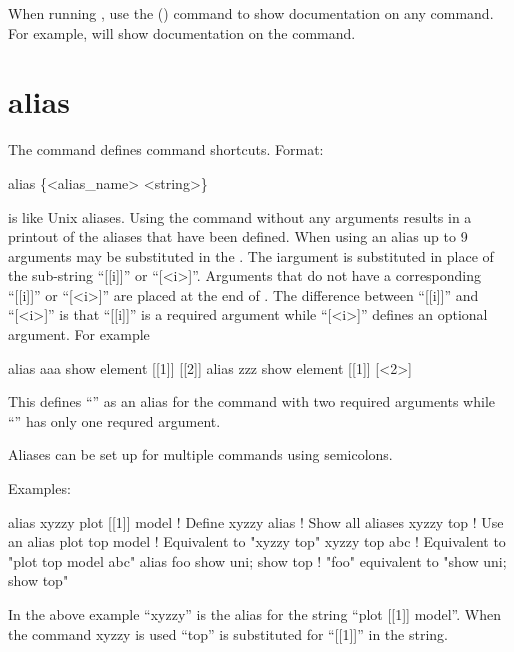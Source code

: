 When running \tao, use the  () command to show documentation on any command.
For example,  will show documentation on the  command.


\vfil
\break

\section{alias}
\label{s:alias}

The  command defines command shortcuts. Format:
\begin{example}
  alias \{<alias_name> <string>\}
\end{example}

\vskip 7pt 

 is like Unix aliases. Using the  command without any arguments
results in a printout of the aliases that have been defined. When using an alias up to 9 arguments
may be substituted in the . The i\Th argument is substituted in place of the sub-string
``[[i]]'' or ``[<i>]''.  Arguments that do not have a corresponding ``[[i]]'' or ``[<i>]'' are
placed at the end of . The difference between ``[[i]]'' and ``[<i>]'' is that ``[[i]]''
is a required argument while ``[<i>]'' defines an optional argument. For example
\begin{example}
  alias aaa show element [[1]] [[2]]
  alias zzz show element [[1]] [<2>]
\end{example}
This defines ``'' as an alias for the  command with two required arguments
while ``'' has only one requred argument.

Aliases can be set up for multiple commands using semicolons.

Examples:
\begin{example}
  alias xyzzy plot [[1]] model  ! Define xyzzy
  alias                         ! Show all aliases
  xyzzy top                     ! Use an alias
  plot top model                ! Equivalent to "xyzzy top"
  xyzzy top abc                 ! Equivalent to "plot top model abc"
  alias foo  show uni; show top ! "foo" equivalent to "show uni; show top"
\end{example}
In the above example ``xyzzy'' is the alias for the string ``plot [[1]] model''.  When the
command xyzzy is used ``top'' is substituted for ``[[1]]'' in the string.


